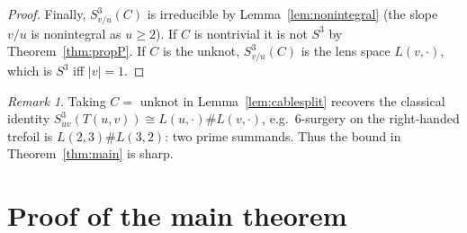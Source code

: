 \documentclass[11pt]{article}
\theoremstyle{definition}
\theoremstyle{remark}
\newtheorem{remark}[theorem]{Remark}
\begin{document}
\begin{proof}
Finally, $S^3_{v/u}(C)$ is irreducible by Lemma~\ref{lem:nonintegral} (the
slope $v/u$ is nonintegral as $u\ge 2$).  If $C$ is nontrivial it is not
$S^3$ by Theorem~\ref{thm:propP}.  If $C$ is the unknot, $S^3_{v/u}(C)$ is
the lens space $L(v,\cdot)$, which is $S^3$ iff $|v|=1$.
\end{proof}

\begin{remark}\label{rem:torusknotcase}
Taking $C=$ unknot in Lemma~\ref{lem:cablesplit} recovers the classical
identity $S^3_{uv}(T(u,v))\cong L(u,\cdot)\# L(v,\cdot)$, e.g.\
$6$-surgery on the right-handed trefoil is $L(2,3)\#L(3,2)$: two prime
summands.  Thus the bound in Theorem~\ref{thm:main} is sharp.
\end{remark}

\section{Proof of the main theorem}\label{sec:proof}
\end{document}
